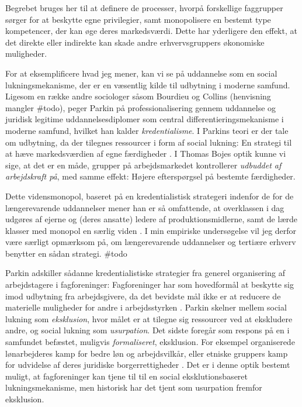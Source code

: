 Begrebet bruges her til at definere de processer, hvorpå forskellige faggrupper sørger for at beskytte egne privilegier, samt monopolisere en bestemt type kompetencer, der kan øge deres markedsværdi. Dette har yderligere den effekt,  at det direkte eller indirekte kan skade andre erhvervsgruppers økonomiske muligheder. 

For at eksemplificere hvad jeg mener, kan vi se på uddannelse som en social lukningsmekanisme, der er en væsentlig kilde til udbytning i moderne samfund. Ligesom en række andre sociologer såsom Bourdieu og Collins (henvisning mangler \#todo), peger Parkin på professionalisering gennem uddannelse og juridisk legitime uddannelsesdiplomer som central differentieringsmekanisme i moderne samfund, hvilket han kalder \emph{kredentialisme}. I Parkins teori er der tale om udbytning, da der tilegnes ressourcer i form af social lukning: En strategi til at hæve markedsværdien af egne færdigheder \parencite[54]{Parkin1979}. I Thomas Bojes optik kunne vi sige, at det er en måde, grupper på arbejdsmarkedet kontrollerer \emph{udbuddet af arbejdskraft på}, med samme effekt: Højere efterspørgsel på bestemte færdigheder. 

Dette vidensmonopol, baseret på en kredentialistisk strategeri indenfor de for de længerevarende uddannelser mener han er så omfattende, at overklassen i dag udgøres af ejerne og (deres ansatte) ledere af produktionsmidlerne, samt de lærde klasser med monopol en særlig viden \parencite[58]{Parkin1979}. I min empiriske undersøgelse vil jeg derfor være særligt opmærksom på, om længerevarende uddannelser og tertiære erhverv benytter en sådan strategi. \#todo %

Parkin adskiller sådanne kredentialistiske strategier fra generel organisering af arbejdstagere i fagforeninger: Fagforeninger har som hovedformål at beskytte sig imod udbytning fra arbejdsgivere, da det bevidste mål ikke er at reducere de materielle muligheder for andre i arbejdsstyrken \parencite[57]{Parkin1979}.
Parkin skelner mellem social lukning som \emph{eksklusion}, hvor målet er at tilegne sig ressourcer ved at ekskludere andre, og social lukning som \emph{usurpation}. Det sidste foregår som respons på en i samfundet befæstet, muligvis \emph{formaliseret}, eksklusion. For eksempel organiserede lønarbejderes kamp for bedre løn og arbejdsvilkår, eller etniske gruppers kamp for udvidelse af deres juridiske borgerrettigheder \parencite[74]{Parkin1979}. Det er i denne optik bestemt muligt, at fagforeninger kan tjene til til en social eksklutionsbaseret lukningsmekanisme, men historisk har det tjent som usurpation fremfor eksklusion. 

